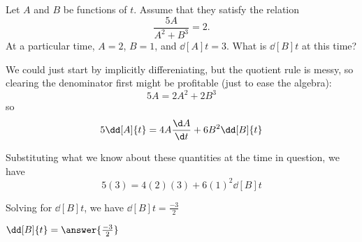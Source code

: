 \documentclass{ximera}
\author{Steven Gubkin}
\begin{document}
\begin{exercise}



Let $A$ and $B$ be functions of $t$.  Assume that they satisfy the relation
\[
\frac{5A}{A^2+B^3} = 2. 
\]
At a particular time, $A = 2$, $B =1$, and $\dd[A]{t} = 3$.  What is
$\dd[B]{t}$ at this time?

\begin{hint}
  We could just start by implicitly differeniating, but the
  quotient rule is messy, so clearing the denominator first
  might be profitable (just to ease the algebra):
  \[
  5A = 2A^2+2B^3
  \]
  so 
  \[
  5\dd[A]{t} = 4A\frac{\d A}{\d t}+6B^2\dd[B]{t}
  \]
\end{hint}

\begin{hint}
  Substituting what we know about these quantities at the time in
  question, we have
\[
5(3) = 4(2)(3)+6(1)^2\dd[B]{t}
\]
\end{hint}

\begin{hint}
	Solving for $\dd[B]{t}$, we have $\dd[B]{t} =
        \frac{-3}{2} $
\end{hint}

\begin{prompt}
	$\dd[B]{t} = \answer{\frac{-3}{2}} $
\end{prompt}

\end{exercise}
\end{document}
